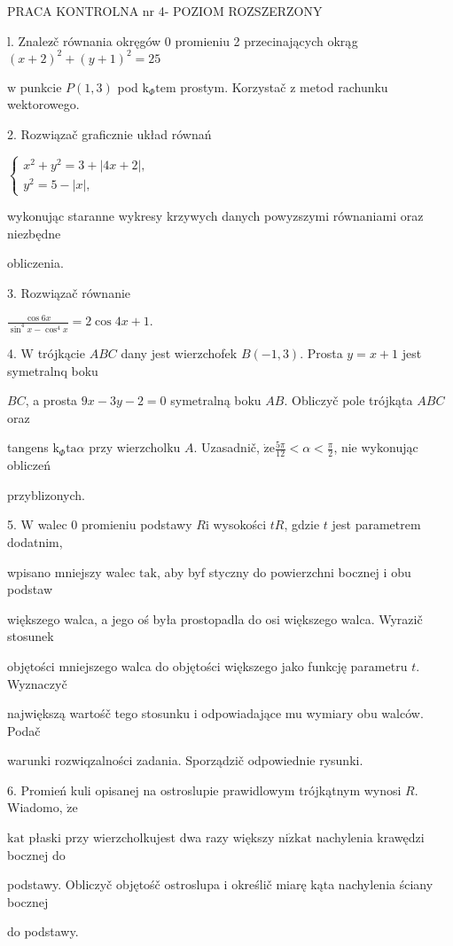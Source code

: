 \documentclass[a4paper,12pt]{article}
\begin{document}
PRACA KONTROLNA nr 4- POZIOM ROZSZERZONY

l. Znalez$\acute{}$č równania okręgów $0$ promieniu 2 przecinających okrąg $(x+2)^{2}+(y+1)^{2}=25$

$\mathrm{w}$ punkcie $P(1,3)$ pod $\mathrm{k}_{\Phi}\mathrm{t}\mathrm{e}\mathrm{m}$ prostym. Korzystač $\mathrm{z}$ metod rachunku wektorowego.

2. Rozwiązač graficznie układ równań

$\left\{\begin{array}{l}
x^{2}+y^{2}=3+|4x+2|,\\
y^{2}=5-|x|,
\end{array}\right.$

wykonując staranne wykresy krzywych danych powyzszymi równaniami oraz niezbędne

obliczenia.

3. Rozwiązač równanie

$\displaystyle \frac{\cos 6x}{\sin^{4}x-\cos^{4}x}=2\cos 4x+1.$

4. $\mathrm{W}$ trójkącie $ABC$ dany jest wierzchofek $B(-1,3)$. Prosta $y=x+1$ jest symetralnq boku

$BC$, a prosta $9x-3y-2=0$ symetralną boku $AB$. Obliczyč pole trójkąta $ABC$ oraz

tangens $\mathrm{k}_{\Phi}\mathrm{t}\mathrm{a}\alpha$ przy wierzcholku $A$. Uzasadnič, $\displaystyle \dot{\mathrm{z}}\mathrm{e}\frac{5\pi}{12}<\alpha<\frac{\pi}{2}$, nie wykonując obliczeń

przyblizonych.

5. $\mathrm{W}$ walec $0$ promieniu podstawy $R\mathrm{i}$ wysokości $tR$, gdzie $t$ jest parametrem dodatnim,

wpisano mniejszy walec $\mathrm{t}\mathrm{a}\mathrm{k}$, aby byf styczny do powierzchni bocznej $\mathrm{i}$ obu podstaw

większego walca, a jego oś była prostopadla do osi większego walca. Wyrazič stosunek

objętości mniejszego walca do objętości większego jako funkcję parametru $t$. Wyznaczyč

największą wartośč tego stosunku $\mathrm{i}$ odpowiadające mu wymiary obu walców. Podač

warunki rozwiqzalności zadania. Sporządzič odpowiednie rysunki.

6. Promień kuli opisanej na ostroslupie prawidlowym trójkątnym wynosi $R$. Wiadomo, $\dot{\mathrm{z}}\mathrm{e}$

$\mathrm{k}\mathrm{a}\mathrm{t}$ płaski przy wierzcholkujest dwa razy większy $\mathrm{n}\mathrm{i}\dot{\mathrm{z}}\mathrm{k}\mathrm{a}\mathrm{t}$ nachylenia krawędzi bocznej do

podstawy. Obliczyč objętośč ostroslupa $\mathrm{i}$ określič miarę kąta nachylenia ściany bocznej

do podstawy.
\end{document}
